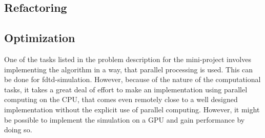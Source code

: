 \subsection{Refactoring}\label{ssec:refactoring}
\subsection{Optimization}\label{ssec:optimization}
One of the tasks listed in the problem description for the mini-project involves implementing the algorithm in a way, that parallel processing is used. This can be done for \gls{fdtd}-simulation. However, because of the nature of the computational tasks, it takes a great deal of effort to make an implementation using parallel computing on the CPU, that comes even remotely close to a well designed implementation without the explicit use of parallel computing.
However, it might be possible to implement the simulation on a GPU and gain performance by doing so. 